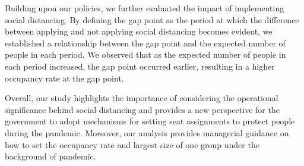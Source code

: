 Building upon our policies, we further evaluated the impact of implementing social distancing. By defining the gap point as the period at which the difference between applying and not applying social distancing becomes evident, we established a relationship between the gap point and the expected number of people in each period. We observed that as the expected number of people in each period increased, the gap point occurred earlier, resulting in a higher occupancy rate at the gap point.


Overall, our study highlights the importance of considering the operational significance behind social distancing and provides a new perspective for the government to adopt mechanisms for setting seat assignments to protect people during the pandemic. Moreover, our analysis provides managerial guidance on how to set the occupancy rate and largest size of one group under the background of pandemic.